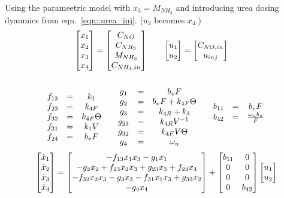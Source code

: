 Using the parameetric model with $x_3 = M_{NH_3}$ and introducing urea dosing
dyanmics from eqn.~\ref{eqn::urea_inj}. ($u_2$ becomes $x_4$.)
\begin{align*}
    \begin{bmatrix} x_1 \\ x_2 \\ x_3 \\ x_4 \end{bmatrix} = \begin{bmatrix} C_{NO} \\ C_{NH_3} \\ M_{NH_3} \\ C_{NH_3, in} \end{bmatrix} \qquad &
    \begin{bmatrix} u_1 \\ u_2  \end{bmatrix} = \begin{bmatrix} C_{NO, in} \\ u_{inj} \end{bmatrix}
\end{align*}
\begin{align*}
    \begin{matrix} 
    \\f_{13} &=& k_1
    \\f_{23} &=& k_{4F}
    \\f_{32} &=& k_{4F} \Theta
    \\f_{31} &=& k_1 V
    \\f_{24} &=& b_v F
     \end{matrix}
    \qquad
    \begin{matrix} 
    \\ g_1    &=& b_v F
    \\ g_2    &=& b_v F + k_{4F} \Theta
    \\ g_{3}  &=& k_{4R}+k_3
    \\ g_{23} &=& k_{4R} V^{-1}
    \\ g_{32} &=& k_{4F} V \Theta
    \\ g_4 &=& \omega_u
     \end{matrix}
    \qquad
    \begin{matrix} 
        b_{11} &=& b_v F
        \\
        b_{42} &=& \frac{\omega_u b_u}{F}
     \end{matrix}
\end{align*}
\begin{equation}{\label{eqn::full_nonlinear}}
     \begin{bmatrix} \dot x_1 \\
        \dot x_2\\
        \dot x_3\\
        \dot x_4 \end{bmatrix} =
    \begin{bmatrix} 
        -f_{13} x_1 x_3
        -g_1 x_1
        \\
        -g_2 x_2
        + f_{23} x_2 x_3
        + g_{23} x_3
        + f_{24} x_4
        \\
        -f_{32} x_2 x_3
        -g_3 x_3
        -f_{31} x_1 x_3
        + g_{32} x_2
        \\
        -g_4 x_4
     \end{bmatrix}
    + \begin{bmatrix} b_{11} & 0\\
          0     & 0\\
          0     & 0\\
          0     & b_{42}   \end{bmatrix}\begin{bmatrix} u_1 \\ u_2  \end{bmatrix}
\end{equation}

